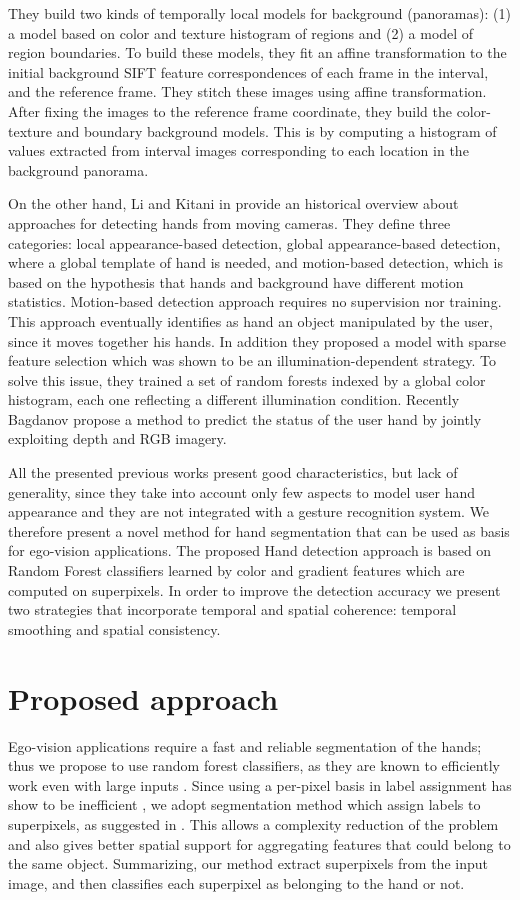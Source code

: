 They build two kinds of temporally local models for background
(panoramas): (1) a model based on color and texture
histogram of regions and (2) a model of region boundaries.
To build these models, they fit an affine transformation
to the initial background SIFT feature correspondences of
each frame in the interval, and the reference frame. They
stitch these images using affine transformation. After fixing
the images to the reference frame coordinate, they build
the color-texture and boundary background models. This is
by computing a histogram of values extracted from interval
images corresponding to each location in the background
panorama.

On the other hand, Li and Kitani in \cite{li13} provide an historical overview about approaches for detecting hands from moving cameras. They define three categories: local appearance-based detection, global appearance-based detection, where a global template of hand is needed, and motion-based detection, which is based on the hypothesis that hands and background have different motion statistics. Motion-based detection approach requires no supervision nor training. This approach eventually identifies as hand an object manipulated by the user, since it moves together his hands. In addition they proposed a model with sparse feature selection which was shown to be an illumination-dependent strategy. To solve this issue, they trained a set of random forests indexed by a global color histogram, each one reflecting a different illumination condition.
Recently Bagdanov \etal \cite{bagdanov12} propose a method to predict the status of the user hand by jointly exploiting depth and RGB imagery.

All the presented previous works present good characteristics, but lack of generality, since they take into account only few aspects to model user hand appearance and they are not integrated with a gesture recognition system. We therefore present a novel method for hand segmentation that can be used as basis for ego-vision applications. 
The proposed Hand detection approach is based on Random Forest classifiers learned by color and gradient features which are computed on superpixels. In order to improve the detection accuracy we present two strategies that incorporate temporal and spatial coherence: temporal smoothing and spatial consistency.

\section{Proposed approach}
Ego-vision applications require a fast and reliable segmentation of the hands; thus we propose to use random forest classifiers, as they are known to efficiently work even with large inputs \cite{leo01}. Since using a per-pixel basis in label assignment has show to be inefficient \cite{jones99}, we adopt segmentation method which assign labels to superpixels, as suggested in \cite{tighe13}. 
This allows a complexity reduction of the problem and also gives better spatial support for aggregating features that could belong to the same object. Summarizing, our method extract superpixels from the input image, and then classifies each superpixel as belonging to the hand or not.

